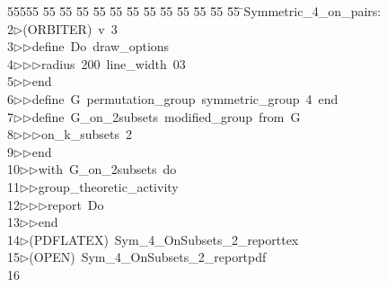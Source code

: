 %
%
\begin{tabbing}
55555 \= 55 \= 55 \= 55 \= 55 \= 55 \= 55 \= 55 \= 55 \= 55 \= 55 \= 55 \= 55 \= \>Symmetric\_4\_on\_pairs:\\[0pt]
2\>$\triangleright$\>(ORBITER)\ v\ 3\ \\[0pt]
3\>$\triangleright$\>$\triangleright$\>define\ Do\ draw\_options\ \\[0pt]
4\>$\triangleright$\>$\triangleright$\>$\triangleright$\>radius\ 200\ line\_width\ 03\ \\[0pt]
5\>$\triangleright$\>$\triangleright$\>end\ \\[0pt]
6\>$\triangleright$\>$\triangleright$\>define\ G\ permutation\_group\ symmetric\_group\ 4\ end\ \\[0pt]
7\>$\triangleright$\>$\triangleright$\>define\ G\_on\_2subsets\ modified\_group\ from\ G\ \\[0pt]
8\>$\triangleright$\>$\triangleright$\>$\triangleright$\>on\_k\_subsets\ 2\ \\[0pt]
9\>$\triangleright$\>$\triangleright$\>end\ \\[0pt]
10\>$\triangleright$\>$\triangleright$\>with\ G\_on\_2subsets\ do\ \\[0pt]
11\>$\triangleright$\>$\triangleright$\>group\_theoretic\_activity\ \\[0pt]
12\>$\triangleright$\>$\triangleright$\>$\triangleright$\>report\ Do\ \\[0pt]
13\>$\triangleright$\>$\triangleright$\>end\\[0pt]
14\>$\triangleright$\>(PDFLATEX)\ Sym\_4\_OnSubsets\_2\_reporttex\\[0pt]
15\>$\triangleright$\>(OPEN)\ Sym\_4\_OnSubsets\_2\_reportpdf\\[0pt]
16\>\end{tabbing}
